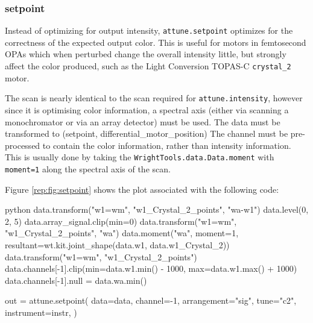 \hypertarget{setpoint}{%
\subsubsection{setpoint}\label{setpoint}}

Instead of optimizing for output intensity,
\texttt{attune.setpoint} optimizes for the correctness
of the expected output color. This is useful for motors in femtosecond
OPAs which when perturbed change the overall intensity little, but
strongly affect the color produced, such as the Light Conversion TOPAS-C
\texttt{crystal\_2} motor.

The scan is nearly identical to the scan required for
\texttt{attune.intensity}, however since it is
optimising color information, a spectral axis (either via scanning a
monochromator or via an array detector) must be used. The data must be
transformed to (setpoint, differential\_motor\_position) The channel
must be pre-processed to contain the color information, rather than
intensity information. This is usually done by taking the
\texttt{WrightTools.data.Data.moment} with \texttt{moment=1} along the
spectral axis of the scan.

Figure \ref{rep:fig:setpoint} shows the plot associated with the following code:

\begin{codefragment}{python}
data.transform("w1=wm", "w1_Crystal_2_points", "wa-w1")
data.level(0, 2, 5)
data.array_signal.clip(min=0)
data.transform("w1=wm", "w1_Crystal_2_points", "wa")
data.moment("wa", moment=1, resultant=wt.kit.joint_shape(data.w1, data.w1_Crystal_2))
data.transform("w1=wm", "w1_Crystal_2_points")
data.channels[-1].clip(min=data.w1.min() - 1000, max=data.w1.max() + 1000)
data.channels[-1].null = data.wa.min()

out = attune.setpoint(
    data=data,
    channel=-1,
    arrangement="sig",
    tune="c2",
    instrument=instr,
)
\end{codefragment}

